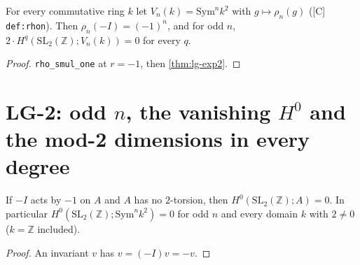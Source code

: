 \begin{theorem}\label{thm:lg-exp2-sym}
  \leanok
  For every commutative ring $k$ let $V_n(k)=\mathrm{Sym}^nk^2$ with $g\mapsto\rho_n(g)$ ([C] \texttt{def:rhon}).  Then
  $\rho_n(-I)=(-1)^n$, and for odd $n$, $2\cdot H^q(\mathrm{SL}_2(\mathbb Z);V_n(k))=0$ for every $q$.
\end{theorem}
\begin{proof}
  \leanok
  \texttt{rho\_smul\_one} at $r=-1$, then \ref{thm:lg-exp2}.
\end{proof}

\section{LG-2: odd \texorpdfstring{$n$}{n}, the vanishing \texorpdfstring{$H^0$}{H0} and the mod-2 dimensions in every degree}

\begin{theorem}[$H^0=0$ when $-I$ acts by $-1$ without $2$-torsion]\label{thm:lg-h0-zero}
  \leanok
  If $-I$ acts by $-1$ on $A$ and $A$ has no $2$-torsion, then $H^0(\mathrm{SL}_2(\mathbb Z);A)=0$.  In particular
  $H^0(\mathrm{SL}_2(\mathbb Z);\mathrm{Sym}^nk^2)=0$ for odd $n$ and every domain $k$ with $2\ne0$ ($k=\mathbb Z$ included).
\end{theorem}
\begin{proof}
  \leanok
  An invariant $v$ has $v=(-I)v=-v$.
\end{proof}

